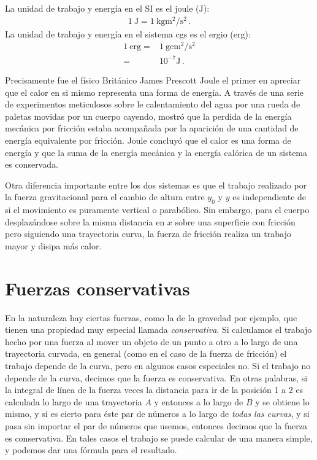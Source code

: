 La unidad de trabajo y energía en el SI es el joule ($\si{\joule}$):
\begin{align}
  \SI{1}{\joule}=\SI{1}{\kilo\gram\metre^2\per\second^2}\,.
\end{align}
La unidad de trabajo y energía en el sistema cgs es el ergio ($\text{erg}$):
\begin{align}
  1\ \text{erg}=&\SI{1}{\gram\centi\meter^2\per\second^2}\nonumber\\
=&10^{-7}\si{\joule}\,.
\end{align}

Precisamente fue el físico Británico James Prescott Joule el primer en
apreciar que el calor en si mismo representa una forma de energía. A
través de una serie de experimentos meticulosos sobre le calentamiento
del agua por una rueda de paletas movidas por un cuerpo cayendo,
mostró que la perdida de la energía mecánica por fricción estaba
acompañada por la aparición de una cantidad de energía equivalente por
fricción. Joule concluyó que el calor es una forma de energía y que la
suma de la energía mecánica y la energía calórica de un sistema es
conservada.

Otra diferencia importante entre los dos sistemas es que el trabajo
realizado por la fuerza gravitacional para el cambio de altura entre
$y_0$ y $y$ es independiente de si el movimiento es puramente vertical
o parabólico. Sin embargo, para el cuerpo desplazándose sobre la misma
distancia en $x$ sobre una superficie con fricción pero siguiendo una
trayectoria curva, la fuerza de fricción realiza un trabajo mayor y
disipa más calor.





\section{Fuerzas conservativas}
En la naturaleza hay ciertas fuerzas, como la de la gravedad por
ejemplo, que tienen una propiedad muy especial llamada
\emph{conservativa}. Si calculamos el trabajo hecho por una fuerza al
mover un objeto de un punto a otro a lo largo de una trayectoria
curvada, en general (como en el caso de la fuerza de fricción) el
trabajo depende de la curva, pero en algunos casos especiales no. Si
el trabajo no depende de la curva, decimos que la fuerza es
conservativa. En otras palabras, si la integral de línea de la fuerza
veces la distancia para ir de la posición 1 a 2 es calculada lo largo
de una trayectoria $A$ y entonces a lo largo de $B$ y se obtiene lo
mismo, y si es cierto para éste par de números a lo largo de
\emph{todas las curvas}, y si pasa sin importar el par de números que
usemos, entonces decimos que la fuerza es conservativa. En tales casos
el trabajo se puede calcular de una manera simple, y podemos dar una
fórmula para el resultado.

